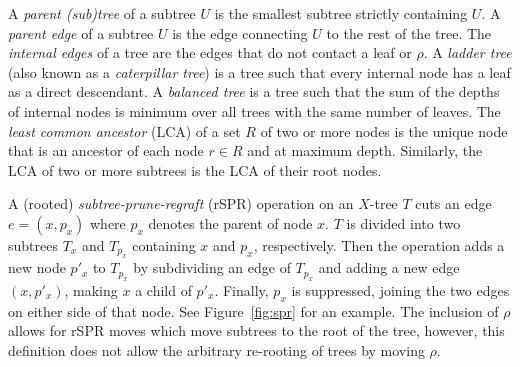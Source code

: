 \documentclass[]{elsarticle}
\begin{document}
A \emph{parent (sub)tree} of a subtree $U$ is the smallest subtree strictly containing $U$.
A \emph{parent edge} of a subtree $U$ is the edge connecting $U$ to the rest of the tree.
The \emph{internal edges} of a tree are the edges that do not contact a leaf or $\rho$.
A \emph{ladder tree} (also known as a \emph{caterpillar tree}) is a tree such that every internal node has a leaf as a direct descendant.
A \emph{balanced tree} is a tree such that the sum of the depths of internal nodes is minimum over all trees with the same number of leaves.
The \emph{least common ancestor} (LCA) of a set $R$ of two or more nodes is the unique node that is an ancestor of each node $r \in R$ and at maximum depth.
Similarly, the LCA of two or more subtrees is the LCA of their root nodes.

A (rooted) \emph{subtree-prune-regraft} (rSPR) operation on an $X$-tree $T$ cuts an edge $e = (x, p_x)$ where $p_x$ denotes the parent of node $x$.
$T$ is divided into two subtrees $T_x$ and $T_{p_x}$ containing $x$ and $p_x$, respectively.
Then the operation adds a new node $p'_x$ to $T_{p_x}$ by subdividing an edge of $T_{p_x}$ and adding a new edge $(x, p'_x)$, making $x$ a child of $p'_x$.
Finally, $p_x$ is suppressed, joining the two edges on either side of that node.
See Figure~\ref{fig:spr} for an example.
The inclusion of $\rho$ allows for rSPR moves which move subtrees to the root of the tree, however, this definition does not allow the arbitrary re-rooting of trees by moving $\rho$.
\end{document}

